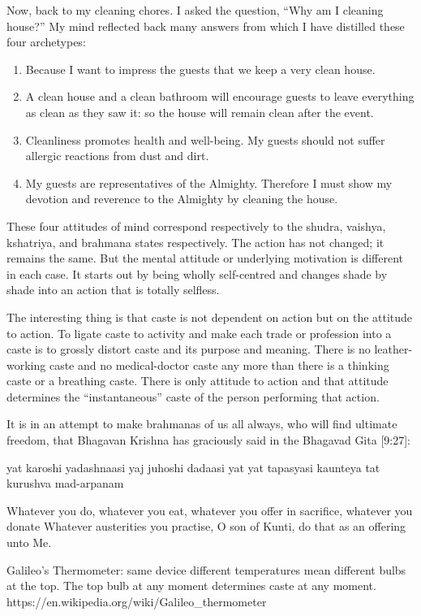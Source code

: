 \documentclass[
  a4paper,
]{article}
\begin{document}
Now, back to my cleaning chores. I asked the question, ``Why am I
cleaning house?'' My mind reflected back many answers from which I have
distilled these four archetypes:

\begin{enumerate}
\def\labelenumi{\arabic{enumi}.}
\item
  Because I want to impress the guests that we keep a very clean house.
\item
  A clean house and a clean bathroom will encourage guests to leave
  everything as clean as they saw it: so the house will remain clean
  after the event.
\item
  Cleanliness promotes health and well-being. My guests should not
  suffer allergic reactions from dust and dirt.
\item
  My guests are representatives of the Almighty. Therefore I must show
  my devotion and reverence to the Almighty by cleaning the house.
\end{enumerate}

These four attitudes of mind correspond respectively to the shudra,
vaishya, kshatriya, and brahmana states respectively. The action has not
changed; it remains the same. But the mental attitude or underlying
motivation is different in each case. It starts out by being wholly
self-centred and changes shade by shade into an action that is totally
selfless.

The interesting thing is that caste is not dependent on action but on
the attitude to action. To ligate caste to activity and make each trade
or profession into a caste is to grossly distort caste and its purpose
and meaning. There is no leather-working caste and no medical-doctor
caste any more than there is a thinking caste or a breathing caste.
There is only attitude to action and that attitude determines the
``instantaneous'' caste of the person performing that action.

It is in an attempt to make brahmanas of us all always, who will find
ultimate freedom, that Bhagavan Krishna has graciously said in the
Bhagavad Gita {[}9:27{]}:

yat karoshi yadashnaasi yaj juhoshi dadaasi yat yat tapasyasi kaunteya
tat kurushva mad-arpanam

Whatever you do, whatever you eat, whatever you offer in sacrifice,
whatever you donate Whatever austerities you practise, O son of Kunti,
do that as an offering unto Me.

Galileo's Thermometer: same device different temperatures mean different
bulbs at the top. The top bulb at any moment determines caste at any
moment. https://en.wikipedia.org/wiki/Galileo\_thermometer
\end{document}
